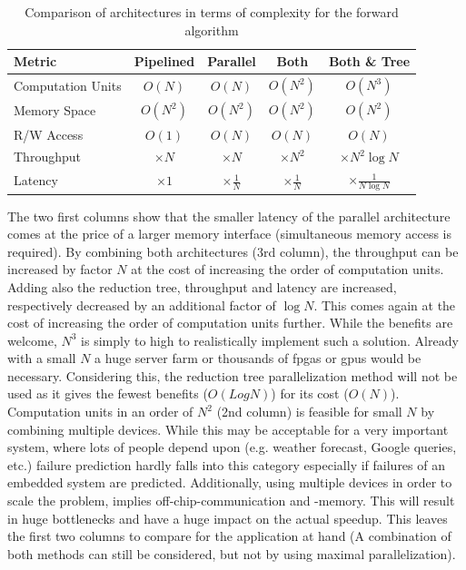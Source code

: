 \documentclass[mscthesis]{usiinfthesis}
\begin{document}
\begin{table}
    \begin{center}
        \begin{tabular}{|l|*{4}{c|}}
            \hline
            Metric & Pipelined & Parallel & Both & Both \& Tree \\
            \hline
            \hline
            Computation Units
            & $O(N)$ & $O(N)$ & $O(N^2)$ & $O(N^3)$ \\
            \hline
            Memory Space
            & $O(N^2)$ & $O(N^2)$ & $O(N^2)$ & $O(N^2)$ \\
            \hline
            R/W Access
            & $O(1)$ & $O(N)$ & $O(N)$ & $O(N)$ \\
            \hline
            \hline
            Throughput
            & $\times N$ & $\times N$ & $\times N^2$ & $\times N^2\log N$ \\
            \hline
            Latency
            & $\times 1$ & $\times \frac{1}{N}$ & $\times \frac{1}{N}$
            & $\times \frac{1}{N\log N}$ \\
            \hline
        \end{tabular}
    \end{center}
    \caption{Comparison of architectures in terms of complexity for the forward
        algorithm}
    \label{tab:summary_O}
\end{table}

The two first columns show that the smaller latency of the parallel
architecture comes at the price of a larger memory interface (simultaneous
memory access is required). By combining both architectures (3rd column), the
throughput can be increased by factor $N$ at the cost of increasing the order
of computation units. Adding also the reduction tree, throughput and latency
are increased, respectively decreased by an additional factor of $\log N$. This
comes again at the cost of increasing the order of computation units further.
While the benefits are welcome, $N^3$ is simply to high to realistically
implement such a solution. Already with a small $N$ a huge server farm or
thousands of \glspl{fpga} or \glspl{gpu} would be necessary. Considering this,
the reduction tree parallelization method will not be used as it gives the
fewest benefits ($O(LogN)$) for its cost ($O(N)$). Computation units in an
order of $N^2$ (2nd column) is feasible for small $N$ by combining multiple
devices. While this may be acceptable for a very important system,  where
lots of people depend upon (e.g. weather forecast, Google queries, etc.)
failure prediction hardly falls into this category especially if failures of an
embedded system are predicted.  Additionally, using multiple devices in order
to scale the problem, implies off-chip-communication and -memory. This will
result in huge bottlenecks and have a huge impact on the actual speedup. This
leaves the first two columns to compare for the application at hand (A
combination of both methods can still be considered, but not by using maximal
parallelization).
\end{document}
